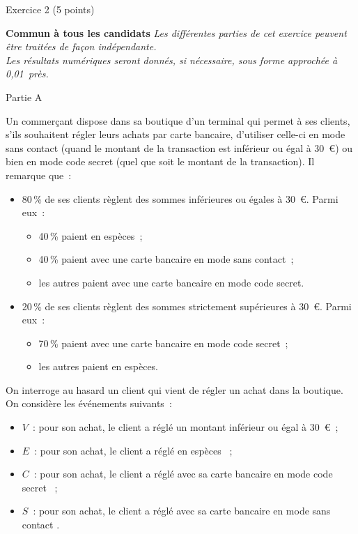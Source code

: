 
\par
\begin{h2}Exercice 2 (5 points)\end{h2}
\textbf{Commun à tous les candidats}
\medskip
\textit{Les différentes parties de cet exercice peuvent être traitées de façon indépendante.}\\
\textit{Les résultats numériques seront donnés, si nécessaire, sous forme approchée à 0,01~près.}
\begin{center}\begin{h3}Partie A \end{h3}\end{center}
Un commerçant dispose dans sa boutique d'un terminal qui permet à ses clients, s'ils souhaitent
régler leurs achats par carte bancaire, d'utiliser celle-ci en mode sans contact (quand le montant de
la transaction est inférieur ou égal à 30~\euro) ou bien en mode code secret (quel que soit le montant
de la transaction).
\smallskip
Il remarque que~:
\begin{itemize}
     \item 80\,\% de ses clients règlent des sommes inférieures ou égales à 30~\euro. Parmi eux~:
     \begin{itemize}[label=---]
          \item 40\,\% paient en espèces~;
          \item 40\,\% paient avec une carte bancaire en mode sans contact~;
          \item les autres paient avec une carte bancaire en mode code secret.
     \end{itemize}
     \item 20\,\% de ses clients règlent des sommes strictement supérieures à 30~\euro. Parmi eux~:
     \begin{itemize}[label=---]
          \item 70\,\% paient avec une carte bancaire en mode code secret~;
          \item les autres paient en espèces.
     \end{itemize}
\end{itemize}
\smallskip
On interroge au hasard un client qui vient de régler un achat dans la boutique.
\medskip
On considère les événements suivants~:
\begin{itemize}
     \item
     $V$~: \og pour son achat, le client a réglé un montant inférieur ou égal à 30~\euro \fg~;
     \item
     $E$~: \og pour son achat, le client a réglé en espèces \fg~;
     \item
     $C$~: \og pour son achat, le client a réglé avec sa carte bancaire en mode code secret \fg~;
     \item
     $S$~: \og pour son achat, le client a réglé avec sa carte bancaire en mode sans contact \fg.
\end{itemize}
